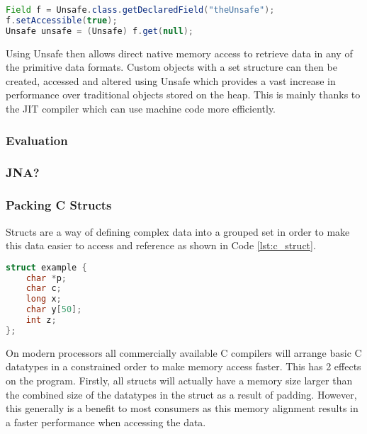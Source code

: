 \documentclass[final_report.tex]{subfiles}
\begin{document}
\begin{lstlisting}[language=Java, caption={Accessing Java Unsafe}, label=lst:java_unsafe]
Field f = Unsafe.class.getDeclaredField("theUnsafe");
f.setAccessible(true);
Unsafe unsafe = (Unsafe) f.get(null);
\end{lstlisting}

Using Unsafe then allows direct native memory access to retrieve data in any of the primitive data formats. Custom objects with a set structure can then be created, accessed and altered using Unsafe which provides a vast increase in performance over traditional objects stored on the heap. This is mainly thanks to the JIT compiler which can use machine code more efficiently.

\subsubsection{Evaluation}

\subsubsection{JNA?}

\subsubsection{Packing C Structs}
Structs are a way of defining complex data into a grouped set in order to make this data easier to access and reference as shown in Code \ref{lst:c_struct}.

\begin{lstlisting}[language=C, caption={Example C Struct}, label=lst:c_struct]
struct example {
    char *p;
    char c;
    long x;
    char y[50];
    int z;
};
\end{lstlisting}

On modern processors all commercially available C compilers will arrange basic C datatypes in a constrained order to make memory access faster. This has 2 effects on the program. Firstly, all structs will actually have a memory size larger than the combined size of the datatypes in the struct as a result of padding. However, this generally is a benefit to most consumers as this memory alignment results in a faster performance when accessing the data. \\
\newline
{}
\end{document}

